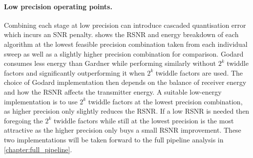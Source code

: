 \documentclass[12pt,a4paper]{report}
\begin{document}
\paragraph{Low precision operating points.}
Combining each stage at low precision can introduce cascaded quantisation error which incurs an SNR penalty.  shows the RSNR and energy breakdown of each algorithm at the lowest feasible precision combination taken from each individual sweep as well as a slightly higher precision combination for comparison. Godard consumes less energy than Gardner while performing similarly without $2^k$ twiddle factors and significantly outperforming it when $2^k$ twiddle factors are used. The choice of Godard implementation then depends on the balance of receiver energy and how the RSNR affects the transmitter energy. A suitable low-energy implementation is to use $2^k$ twiddle factors at the lowest precision combination, as higher precision only slightly reduces the RSNR. If a low RSNR is needed then foregoing the $2^k$ twiddle factors while still at the lowest precision is the most attractive as the higher precision only buys a small RSNR improvement. These two implementations will be taken forward to the full pipeline analysis in \cref{chapter:full_pipeline}.
\end{document}
